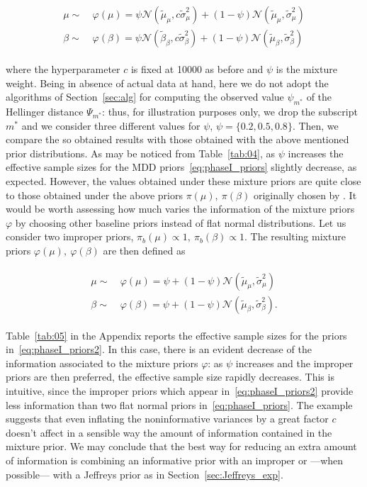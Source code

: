 \documentclass{statsoc}
\begin{document}
\begin{align}
\begin{split}
\mu \sim & \ \varphi(\mu)= \psi \mathcal{N}(\tilde{\mu}_{\mu}, c\tilde{\sigma}^{2}_{\mu})+ (1-\psi)\mathcal{N}(\tilde{\mu}_{\mu}, \tilde{\sigma}^{2}_{\mu})\\
\beta \sim & \ \varphi(\beta)= \psi \mathcal{N}(\tilde{\beta}_{\beta}, c\tilde{\sigma}^{2}_{\beta})+ (1-\psi)\mathcal{N}(\tilde{\mu}_{\beta}, \tilde{\sigma}^{2}_{\beta})
\end{split}
\label{eq:phaseI_priors}
\end{align}

 where the hyperparameter $c$ is fixed at 10000 as before and $\psi$ is the mixture weight. Being in absence of actual data at hand, here we do not adopt the algorithms of Section~\ref{sec:alg} for computing the observed value $\psi_{m^{*}}$ of the Hellinger distance $\Psi_{m^{*}}$: thus, for illustration purposes only, we drop the subscript $m^{*}$ and we consider three different values for $\psi$, $\psi= \{0.2,0.5,0.8 \}$. Then, we compare the so obtained results with those obtained with the above mentioned prior distributions.  As may be noticed from Table~\ref{tab:04}, as $\psi$ increases the effective sample sizes for the MDD priors~\eqref{eq:phaseI_priors} slightly decrease, as expected. However, the values obtained under these mixture priors are quite close to those obtained under the above priors $\pi(\mu),\  \pi(\beta)$ originally chosen by \cite{thall2003practical}. It would be worth assessing how much varies the information of the mixture priors $\varphi$ by choosing other baseline priors instead of flat normal distributions. Let us consider two improper priors, $\pi_{b}(\mu) \propto 1, \ \pi_{b}(\beta) \propto 1$. The resulting mixture priors $\varphi(\mu), \ \varphi(\beta)$ are then defined as
 
 \begin{align}
 \begin{split}
\mu \sim & \ \varphi(\mu)= \psi + (1-\psi)\mathcal{N}(\tilde{\mu}_{\mu}, \tilde{\sigma}^{2}_{\mu})\\
\beta \sim & \ \varphi(\beta)= \psi + (1-\psi)\mathcal{N}(\tilde{\mu}_{\beta}, \tilde{\sigma}^{2}_{\beta}).
\end{split}
\label{eq:phaseI_priors2}
\end{align}

Table~\ref{tab:05} in the Appendix reports the effective sample sizes for the priors in~\eqref{eq:phaseI_priors2}. In this case, there is an evident decrease of the information associated to the mixture priors $\varphi$: as $\psi$ increases and the improper priors are then preferred, the effective sample size rapidly decreases. This is intuitive, since the improper priors which appear in~\eqref{eq:phaseI_priors2} provide less information than two flat normal priors in~\eqref{eq:phaseI_priors}. The example suggests that even inflating the noninformative variances by a great factor $c$ doesn't affect in a sensible way the amount of information contained in the mixture prior. We may conclude that the best way for reducing an extra amount of information is combining an informative prior with an improper or ---when possible--- with a Jeffreys prior as in Section~\ref{sec:Jeffreys_exp}.
 
\end{document}
